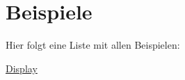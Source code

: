 \section{Beispiele}
Hier folgt eine Liste mit allen Beispielen\+:\begin{DoxyCompactItemize}
\item 
\hyperlink{Display-example}{Display}
\end{DoxyCompactItemize}
